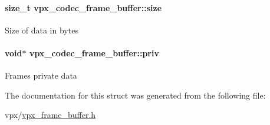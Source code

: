 \paragraph[{\texorpdfstring{size}{size}}]{\setlength{\rightskip}{0pt plus 5cm}size\+\_\+t vpx\+\_\+codec\+\_\+frame\+\_\+buffer\+::size}\hypertarget{structvpx__codec__frame__buffer_aa36d70c1f42be1cd31287b8ecf7b53a5}{}\label{structvpx__codec__frame__buffer_aa36d70c1f42be1cd31287b8ecf7b53a5}
Size of data in bytes 
\paragraph[{\texorpdfstring{priv}{priv}}]{\setlength{\rightskip}{0pt plus 5cm}void$\ast$ vpx\+\_\+codec\+\_\+frame\+\_\+buffer\+::priv}\hypertarget{structvpx__codec__frame__buffer_a7037d613f7b54f9cdad629cf17cb5e18}{}\label{structvpx__codec__frame__buffer_a7037d613f7b54f9cdad629cf17cb5e18}
Frame\textquotesingle{}s private data 

The documentation for this struct was generated from the following file\+:\begin{DoxyCompactItemize}
\item 
vpx/\hyperlink{vpx__frame__buffer_8h}{vpx\+\_\+frame\+\_\+buffer.\+h}\end{DoxyCompactItemize}
